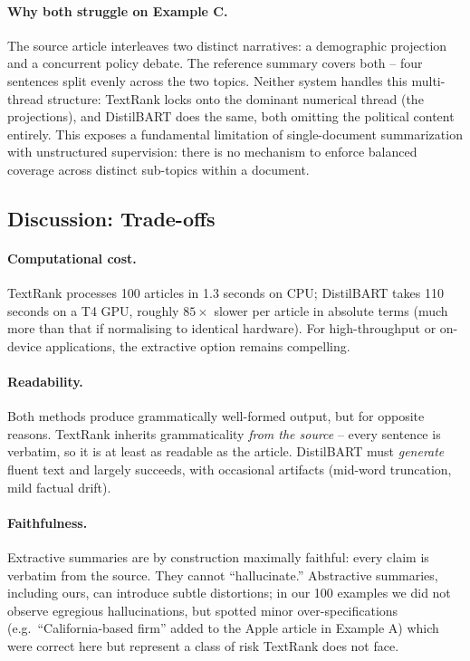 \documentclass[11pt,a4paper]{article}
\begin{document}
\paragraph{Why both struggle on Example C.} The source article
interleaves two distinct narratives: a demographic projection and a
concurrent policy debate. The reference summary covers both -- four
sentences split evenly across the two topics. Neither system handles
this multi-thread structure: TextRank locks onto the dominant
numerical thread (the projections), and DistilBART does the same,
both omitting the political content entirely. This exposes a
fundamental limitation of single-document summarization with
unstructured supervision: there is no mechanism to enforce balanced
coverage across distinct sub-topics within a document.

\subsection{Discussion: Trade-offs}

\paragraph{Computational cost.} TextRank processes 100 articles in
1.3 seconds on CPU; DistilBART takes 110 seconds on a T4 GPU,
roughly $85\times$ slower per article in absolute terms (much more
than that if normalising to identical hardware). For high-throughput
or on-device applications, the extractive option remains compelling.

\paragraph{Readability.} Both methods produce grammatically well-formed
output, but for opposite reasons. TextRank inherits grammaticality
\emph{from the source} -- every sentence is verbatim, so it is at
least as readable as the article. DistilBART must \emph{generate}
fluent text and largely succeeds, with occasional artifacts (mid-word
truncation, mild factual drift).

\paragraph{Faithfulness.} Extractive summaries are by construction
maximally faithful: every claim is verbatim from the source. They
cannot ``hallucinate.'' Abstractive summaries, including ours, can
introduce subtle distortions; in our 100 examples we did not observe
egregious hallucinations, but spotted minor over-specifications
(e.g.\ ``California-based firm'' added to the Apple article in
Example A) which were correct here but represent a class of risk
TextRank does not face.
\end{document}
